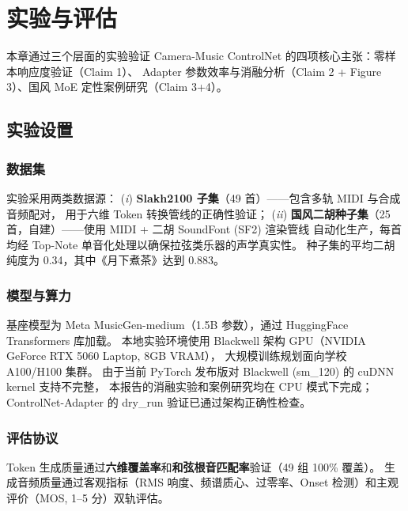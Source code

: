 \section{实验与评估}

本章通过三个层面的实验验证 Camera-Music ControlNet 的四项核心主张：零样本响应度验证（Claim 1）、
Adapter 参数效率与消融分析（Claim 2 + Figure 3）、国风 MoE 定性案例研究（Claim 3+4）。

\subsection{实验设置}

\subsubsection{数据集}

实验采用两类数据源：
(\textit{i}) \textbf{Slakh2100 子集}（49 首）\cite{slakh}——包含多轨 MIDI 与合成音频配对，
用于六维 Token 转换管线的正确性验证；
(\textit{ii}) \textbf{国风二胡种子集}（25 首，自建）——使用 MIDI + 二胡 SoundFont (SF2) 渲染管线
自动化生产，每首均经 Top-Note 单音化处理以确保拉弦类乐器的声学真实性。
种子集的平均二胡纯度为 0.34，其中《月下煮茶》达到 0.883。

\subsubsection{模型与算力}

基座模型为 Meta MusicGen-medium（1.5B 参数），通过 HuggingFace Transformers 库加载。
本地实验环境使用 Blackwell 架构 GPU（NVIDIA GeForce RTX 5060 Laptop, 8GB VRAM），
大规模训练规划面向学校 A100/H100 集群。
由于当前 PyTorch 发布版对 Blackwell (sm\_120) 的 cuDNN kernel 支持不完整，
本报告的消融实验和案例研究均在 CPU 模式下完成；
ControlNet-Adapter 的 dry\_run 验证已通过架构正确性检查。

\subsubsection{评估协议}

Token 生成质量通过\textbf{六维覆盖率}和\textbf{和弦根音匹配率}验证（49 组 100\% 覆盖）。
生成音频质量通过客观指标（RMS 响度、频谱质心、过零率、Onset 检测）和主观评价（MOS, 1--5 分）双轨评估。

